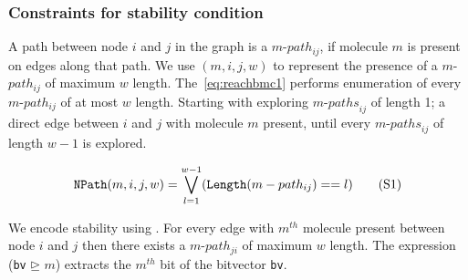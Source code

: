 \subsubsection{Constraints for stability condition}
%
A path between node $i$ and $j$ in the graph is a $m$-$path_{ij}$, if molecule $m$ is present on edges along that path.
%
%
We use {\npath}$(m, i, j, w)$ to represent the presence of a $m$-$path_{ij}$ of maximum $w$ length.
%
%
The~\ref{eq:reachbmc1} performs enumeration of every $m$-$path_{ij}$ of at most $w$ length. 
%
Starting with exploring $m$-${paths}_{ij}$ of length 1; a direct edge between $i$ and $j$ with molecule $m$ present, until every $m$-${paths}_{ij}$ of length $w-1$ is explored.


\begin{align}
\texttt{NPath}(m, i, j, w) = \bigvee\limits_{l = 1}^{w-1} (\texttt{Length} (m-path_{ij}) == l)
  \tag{S1}\label{eq:reachbmc1}
\end{align}

We encode stability using \npath. For every edge with $m^{th}$ molecule present between node $i$ and $j$ then there exists a $m$-$path_{ji}$ of maximum $w$ length.
%
The expression (\texttt{bv} $\unrhd$ $m$) extracts the $m^{th}$ bit of the bitvector \texttt{bv}. 

